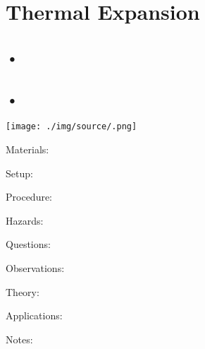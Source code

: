 \section{Thermal Expansion}

\begin{multicols}{2}


\section*{•}




\subsection{•}

\begin{center}
\texttt{[image: ./img/source/.png]}
\end{center}

\begin{description*}
\item[Materials:]{}
\item[Setup:]{}
\item[Procedure:]{}
\item[Hazards:]{}
\item[Questions:]{}
\item[Observations:]{}
\item[Theory:]{}
\item[Applications:]{}
\item[Notes:]{}
\end{description*}



\end{multicols}

\pagebreak